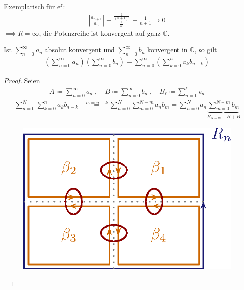 \documentclass[a4paper,10pt]{scrbook}
\begin{document}
\begin{notice*}
  Exemplarisch für $\mathrm{e}^z$:
  \begin{align*}
    \left| \frac{a_{n+1}}{a_n} \right| = \frac{\frac{1}{(n+1)!}}{\frac{1}{n!}} = \frac{1}{n+1} \to 0
  \end{align*}
  $\implies R = \infty$, die Potenzreihe ist konvergent auf ganz $\mathbb{C}$.
\end{notice*}

\begin{theorem}
  Ist $\sum\limits_{n=0}^{\infty} a_n$ absolut konvergent und $\sum\limits_{n=0}^{\infty} b_n$ konvergent in $\mathbb{C}$, so gilt
  \begin{align*}
    \left( \sum\limits_{n=0}^{\infty} a_n \right) \left( \sum\limits_{n=0}^{\infty} b_n \right) =
    \sum\limits_{n=0}^{\infty} \left( \sum\limits_{k=0}^{n} a_k b_{n-k} \right)
  \end{align*}
  \begin{proof}
    Seien
    \begin{align*}
      A \coloneq \sum\limits_{n=0}^{\infty} a_n \; , \quad
      B \coloneq \sum\limits_{n=0}^{\infty} b_n \; , \quad
      B_{\ell} \coloneq \sum\limits_{n=0}^{\ell} b_n
    \end{align*}
    \begin{align*}
      \sum\limits_{n=0}^{N} \sum\limits_{k=0}^{n} a_k b_{n-k} &\overset{m = n - k}{=} \sum\limits_{n=0}^{N} \sum\limits_{m=0}^{N-m} a_n b_m = \sum\limits_{n=0}^{N} a_n \underbrace{\sum\limits_{m=0}^{N-m} b_m}_{B_{N-m} - B + B}
    \end{align*}
    \begin{figure}[H]
      \centering
      \vspace*{-2em}
      \includegraphics[scale=0.2]{images/ana3-tmp-5}

\end{figure}
\end{proof}
\end{theorem}
\end{document}
